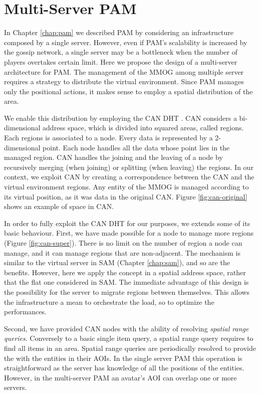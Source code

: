 \documentclass[final,10pt,a5paper]{phdimt}
\theoremstyle{definition}
\begin{document}
\section{Multi-Server PAM}
\label{sec:multiserver}

In Chapter \ref{chap:pam} we described PAM by considering an infrastructure composed by a single server.
However, even if PAM's scalability is increased by the gossip network, a single server may be a bottleneck when the number of players overtakes certain limit. Here we propose the design of a multi-server architecture for PAM.
The management of the MMOG among multiple server requires a strategy to distribute the virtual environment.
Since PAM manages only the positional actions, it makes sense to employ a spatial distribution of the area. 


We enable this distribution by employing the CAN DHT \cite{ratnasamy2001scalable}.
CAN considers a bi-dimensional address space, which is divided into squared areas, called regions.
Each regions is associated to a node. Every data is represented by a 2-dimensional point.
Each node handles all the data whose point lies in the managed region.
CAN handles the joining and the leaving of a node by recursively merging (when joining) or splitting (when leaving) the regions.
In our context, we exploit CAN by creating a correspondence between the CAN and the virtual environment regions.
Any entity of the MMOG is managed according to its virtual position, as it was data in the original CAN.
Figure \ref{fig:can-original} shows an example of space in CAN.


In order to fully exploit the CAN DHT for our purposes, we extends some of its basic behaviour.
First, we have made possible for a node to manage more regions (Figure \ref{fig:can-super}).
There is no limit on the number of region a node can manage, and it can manage regions that are non-adjacent.
The mechanism is similar to the virtual server in SAM (Chapter \ref{chap:sam}), and so are the benefits.
However, here we apply the concept in a spatial address space, rather that the flat one considered in SAM.
The immediate advantage of this design is the possibility for the server to migrate regions between themselves.
This allows the infrastructure a mean to orchestrate the load, so to optimize the performances.

Second, we have provided CAN nodes with the ability of resolving \textit{spatial range queries}.
Conversely to a basic single item query, a spatial range query requires to find all items in an area.
Spatial range queries are periodically resolved to provide the with the entities in their AOIs.
In the single server PAM this operation is straightforward as the server has knowledge of all the positions of the entities.
However, in the multi-server PAM an avatar's AOI can overlap one or more servers.
\end{document}
